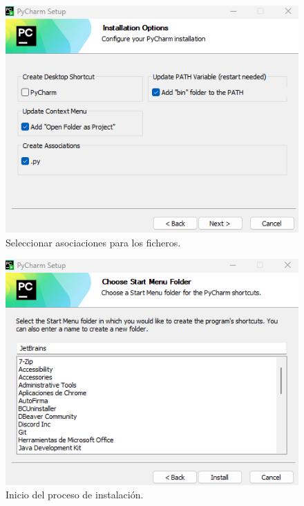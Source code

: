\documentclass{article}
\begin{document}
\begin{figure}[H]
    \centering
    \includegraphics[scale=0.8]{py4.png}
    \caption{Seleccionar asociaciones para los ficheros.}
\end{figure}

\begin{figure}[H]
    \centering
    \includegraphics[scale=0.8]{py5.png}
    \caption{Inicio del proceso de instalación.}
\end{figure}
\end{document}
